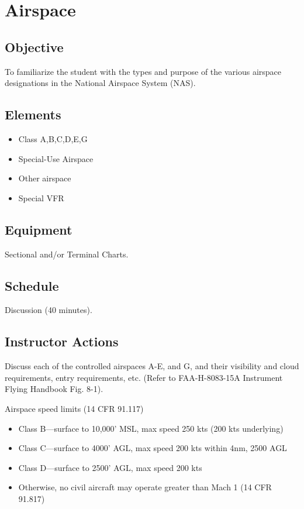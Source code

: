 \section{Airspace}

\subsection{Objective}

To familiarize the student with the types and purpose of the various airspace
designations in the National Airspace System (NAS).

\subsection{Elements}

\begin{itemize}
  \item Class A,B,C,D,E,G
  \item Special-Use Airspace
  \item Other airspace
  \item Special VFR
\end{itemize}

\subsection{Equipment}

Sectional and/or Terminal Charts.

\subsection{Schedule}

Discussion (40 minutes).

\subsection{Instructor Actions}

Discuss each of the controlled airspaces A-E, and G, and their visibility and
cloud requirements, entry requirements, etc. (Refer to FAA-H-8083-15A
Instrument Flying Handbook Fig. 8-1).

Airspace speed limits (14 CFR 91.117)
\begin{itemize}
  \item Class B—surface to 10,000' MSL, max speed 250 kts (200 kts underlying)
  \item Class C—surface to 4000' AGL, max speed 200 kts within 4nm, 2500 AGL
  \item Class D—surface to 2500' AGL, max speed 200 kts
  \item Otherwise, no civil aircraft may operate greater than Mach 1 (14 CFR 91.817)
\end{itemize}


